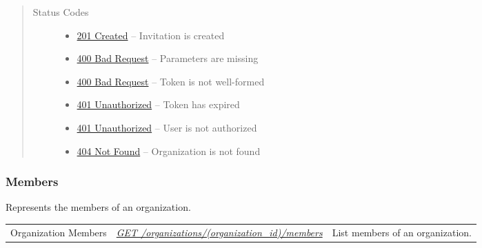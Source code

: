 \documentclass[letterpaper,10pt,english]{sphinxmanual}
\begin{document}
\begin{fulllineitems}
\begin{quote}
\begin{description}
\begin{itemize}
\end{itemize}

\item[{Status Codes}] \leavevmode\begin{itemize}
\item {} 
\href{http://www.w3.org/Protocols/rfc2616/rfc2616-sec10.html\#sec10.2.2}{201 Created} -- Invitation is created

\item {} 
\href{http://www.w3.org/Protocols/rfc2616/rfc2616-sec10.html\#sec10.4.1}{400 Bad Request} -- Parameters are missing

\item {} 
\href{http://www.w3.org/Protocols/rfc2616/rfc2616-sec10.html\#sec10.4.1}{400 Bad Request} -- Token is not well-formed

\item {} 
\href{http://www.w3.org/Protocols/rfc2616/rfc2616-sec10.html\#sec10.4.2}{401 Unauthorized} -- Token has expired

\item {} 
\href{http://www.w3.org/Protocols/rfc2616/rfc2616-sec10.html\#sec10.4.2}{401 Unauthorized} -- User is not authorized

\item {} 
\href{http://www.w3.org/Protocols/rfc2616/rfc2616-sec10.html\#sec10.4.5}{404 Not Found} -- Organization is not found

\end{itemize}

\end{description}\end{quote}

\end{fulllineitems}



\subsubsection{Members}
\label{\detokenize{resources/organization:members}}
Represents the members of an organization.

\noindent\begin{tabulary}{\linewidth}{|L|L|L|}
\hline
{}\relax &\relax &\relax \\
\hline
Organization Members
&
{\hyperref[\detokenize{resources/organization:get--organizations-(organization_id)-members}]{\emph{GET /organizations/(organization\_id)/members}}}
&
List members of an organization.
\\
\hline\end{tabulary}
\end{document}
